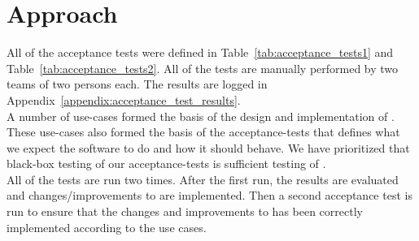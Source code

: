 \section{Approach}
\label{sec:testing_approach}

All of the acceptance tests were defined in Table~\ref{tab:acceptance_tests1} and Table~\ref{tab:acceptance_tests2}.
All of the tests are manually performed by two teams of two persons each.
The results are logged in Appendix~\ref{appendix:acceptance_test_results}. \\

A number of use-cases formed the basis of the design and implementation of \projectname{}.
These use-cases also formed the basis of the acceptance-tests that defines what we expect the software to do and how it should behave. 
We have prioritized that black-box testing of our acceptance-tests is sufficient testing of \projectname{}. \\

All of the tests are run two times. 
After the first run, the results are evaluated and changes/improvements to \projectname{} are implemented. 
Then a second acceptance test is run to ensure that the changes and improvements to \projectname{} has been correctly implemented according to the use cases. 


